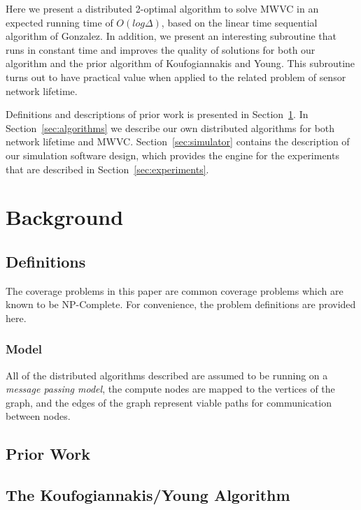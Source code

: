 \documentclass[conference, 10pt]{IEEEtran}
\begin{document}
Here we present a distributed 2-optimal algorithm to solve MWVC in an expected running time of $O(log\Delta)$, based on the linear time sequential algorithm of Gonzalez\cite{Gonzalez1995129}. In addition, we present an interesting subroutine that runs in constant time and improves the quality of solutions for both our algorithm and the prior algorithm of Koufogiannakis and Young\cite{1582746}. This subroutine turns out to have practical value when applied to the related problem of sensor network lifetime.

Definitions and descriptions of prior work is presented in Section~\ref{sec:background}. In Section~\ref{sec:algorithms} we describe our own distributed algorithms for both network lifetime and MWVC. Section~\ref{sec:simulator} contains the description of our simulation software design, which provides the engine for the experiments that are described in Section~\ref{sec:experiments}.

\section{Background}
\label{sec:background}
\subsection{Definitions}
The coverage problems in this paper are common coverage problems which are known to be NP-Complete. For convenience, the problem definitions are provided here.




\subsubsection{Model}
\label{ssb:com-model}

All of the distributed algorithms described are assumed to be running on a {\em message passing model}, the compute nodes are mapped to the vertices of the graph, and the edges of the graph represent viable paths for communication between nodes. 

\subsection{Prior Work}



\subsection{The Koufogiannakis/Young Algorithm}
\label{sec:k-y-alg}
\end{document}
